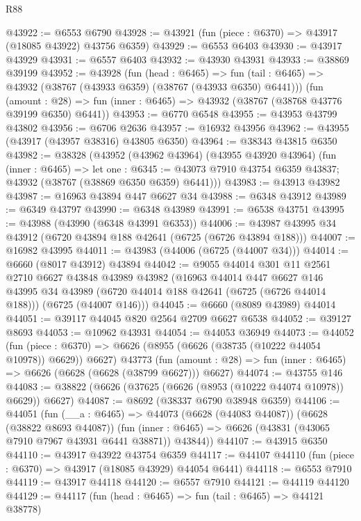 \begin{lexlean}{R88}
\begin{coremodule}
@43922 := @6553 @6790
@43928 := @43921 (fun (piece : @6370) => @43917 (@18085 @43922) @43756 @6359)
@43929 := @6553 @6403
@43930 := @43917 @43929
@43931 := @6557 @6403
@43932 := @43930 @43931
@43933 := @38869 @39199
@43952 := @43928
    (fun (head : @6465) =>
    fun (tail : @6465) => @43932 (@38767 (@43933 @6359) (@38767 (@43933 @6350) @6441)))
    (fun (amount : @28) =>
    fun (inner : @6465) => @43932 (@38767 (@38768 @43776 @39199 @6350) @6441))
@43953 := @6770 @6548
@43955 := @43953 @43799 @43802
@43956 := @6706 @2636
@43957 := @16932 @43956
@43962 := @43955 (@43917 (@43957 @38316) @43805 @6350)
@43964 := @38343 @43815 @6350
@43982 := @38328
    (@43952
      (@43962 @43964)
      (@43955 @43920 @43964)
      (fun (inner : @6465) =>
      let one : @6345 := @43073 @7910 @43754 @6359 @43837;
      @43932 (@38767 (@38869 @6350 @6359) @6441)))
@43983 := @43913 @43982
@43987 := @16963 @43894 @447 @6627 @34
@43988 := @6348 @43912
@43989 := @6349 @43797
@43990 := @6348 @43989
@43991 := @6538 @43751
@43995 := @43988 (@43990 (@6348 @43991 @6353))
@44006 := @43987 @43995 @34 @43912 (@6720 @43894 @188 @42641 (@6725 (@6726 @43894 @188)))
@44007 := @16982 @43995
@44011 := @43983 (@44006 (@6725 (@44007 @34)))
@44014 := @6660 (@8017 @43912) @43894
@44042 := @9055
    @44014
    @301
    @11
    @2561
    @2710
    @6627
    @43848
    @43989
    @43982
    (@16963
      @44014
      @447
      @6627
      @146
      @43995
      @34
      @43989
      (@6720 @44014 @188 @42641 (@6725 (@6726 @44014 @188)))
      (@6725 (@44007 @146)))
@44045 := @6660 (@8089 @43989) @44014
@44051 := @39117 @44045 @820 @2564 @2709 @6627 @6538
@44052 := @39127 @8693
@44053 := @10962 @43931
@44054 := @44053 @36949
@44073 := @44052
    (fun (piece : @6370) => @6626 (@8955 (@6626 (@38735 (@10222 @44054 @10978)) @6629)) @6627)
    @43773
    (fun (amount : @28) => fun (inner : @6465) => @6626 (@6628 (@6628 (@38799 @6627))) @6627)
@44074 := @43755 @146
@44083 := @38822 (@6626 (@37625 (@6626 (@8953 (@10222 @44074 @10978)) @6629)) @6627)
@44087 := @8692 (@38337 @6790 @38948 @6359)
@44106 := @44051
    (fun (__a : @6465) =>
    @44073
      (@6628 (@44083 @44087))
      (@6628 (@38822 @8693 @44087))
      (fun (inner : @6465) => @6626 (@43831 (@43065 @7910 @7967 @43931 @6441 @38871)) @43844))
@44107 := @43915 @6350
@44110 := @43917 @43922 @43754 @6359
@44117 := @44107 @44110 (fun (piece : @6370) => @43917 (@18085 @43929) @44054 @6441)
@44118 := @6553 @7910
@44119 := @43917 @44118
@44120 := @6557 @7910
@44121 := @44119 @44120
@44129 := @44117
    (fun (head : @6465) => fun (tail : @6465) => @44121 @38778)

\end{coremodule}
\end{lexlean}
